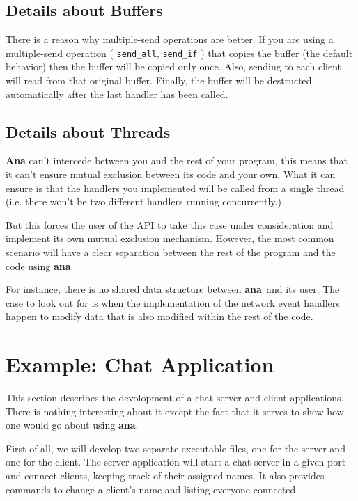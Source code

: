 \documentclass[a4paper,12pt,english]{article}
\newcommand{\ana}{\textbf{ana}}
\begin{document}
\subsection{Details about Buffers}
\label{bufcopy}

There is a reason why  multiple-send operations are better. If you are
using     a    multiple-send    operation     (    \texttt{send\_all},
\texttt{send\_if} ) that copies the buffer (the default behavior) then
the buffer will be copied only once. Also, sending to each client will
read from that original buffer. Finally, the buffer will be destructed
automatically after the last handler has been called.

\subsection{Details about Threads}

\textbf{Ana} can't intercede between you and the rest of your program,
this means that it can't  ensure mutual exclusion between its code and
your own. What it can ensure is that the handlers you implemented will
be  called from a  single thread  (i.e. there  won't be  two different
handlers running concurrently.)

But  this  forces  the  user  of  the API  to  take  this  case  under
consideration    and    implement    its    own    mutual    exclusion
mechanism.  However,  the  most  common  scenario will  have  a  clear
separation between the rest of the program and the code using \ana.

For instance, there is no shared data structure between \ana \ and its
user.  The case  to look  out for  is when  the implementation  of the
network event  handlers happen  to modify data  that is  also modified
within the rest of the code.

\section{Example: Chat Application}

This  section describes  the  devolopment  of a chat server and client
applications. There is  nothing  interesting  about it except the fact
that it serves to show how one would go about using \ana.

First of all, we will  develop  two  separate executable files, one for
the server and one for the client. The server application  will start a 
chat server in a given  port  and  connect clients, keeping track of their
assigned  names. It also provides commands to change a client's name and
listing everyone connected.
\end{document}
